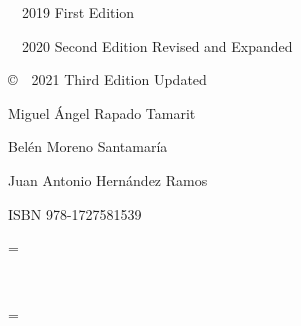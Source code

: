 \documentclass[a4paper,11pt,twoside,english]{book}
\begin{document}
    \noindent\hspace{0.14cm} \ \ 2019 First Edition
    
    \noindent\hspace{0.14cm} \ \ 2020 Second Edition Revised and Expanded
    
    \noindent \copyright  \ \ 2021 Third Edition Updated
    \vspace{\baselineskip}
    
    \hspace{0.7cm} Miguel Ángel Rapado Tamarit  
       
    \hspace{0.7cm} Belén Moreno Santamaría  
             
    \hspace{0.7cm} Juan Antonio Hernández Ramos
    
    \vspace{0.5cm}            
    \noindent ISBN 978-1727581539 
    \clearpage
    
  
    \frontmatter
    
    
    \parskip = \baselineskip %
    
    
    \newpage
    \setlength{\parskip}{-0.5mm}
    \tableofcontents
    ~\clearpage


    
    \parskip = \baselineskip
    
    \mainmatter
  
  \newcommand\home{../solutions/fortran preliminaries/sources}
  
    
    
    
    
   
    
   
    
    
    
    
     
 
\end{document}
